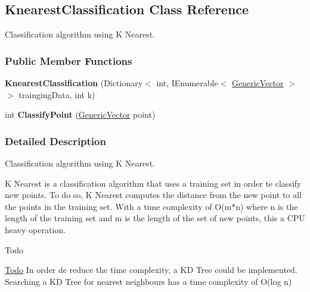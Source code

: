\hypertarget{classDataTools_1_1classification_1_1KnearestClassification}{}\subsection{Knearest\+Classification Class Reference}
\label{classDataTools_1_1classification_1_1KnearestClassification}


Classification algorithm using K Nearest.  


\subsubsection*{Public Member Functions}
\begin{DoxyCompactItemize}
\item 
\mbox{\label{classDataTools_1_1classification_1_1KnearestClassification_a588873a311daa525f0bdf6663b1d5eef}} 
{\bfseries Knearest\+Classification} (Dictionary$<$ int, I\+Enumerable$<$ \hyperlink{classDataTools_1_1GenericVector}{Generic\+Vector} $>$$>$ trainging\+Data, int k)
\item 
\mbox{\label{classDataTools_1_1classification_1_1KnearestClassification_a1c75b6bb19251c5c39a7bfe67a1a2b1f}} 
int {\bfseries Classify\+Point} (\hyperlink{classDataTools_1_1GenericVector}{Generic\+Vector} point)
\end{DoxyCompactItemize}


\subsubsection{Detailed Description}
Classification algorithm using K Nearest. 

K Nearest is a classification algorithm that uses a training set in order te classify new points. To do so, K Nearest computes the distance from the new point to all the points in the training set. With a time complexity of {\ttfamily O(m$\ast$n)} where {\ttfamily n} is the length of the training set and {\ttfamily m} is the length of the set of new points, this a C\+PU heavy operation.

\begin{DoxyRefDesc}{Todo}
\item[\hyperlink{todo__todo000001}{Todo}]In order de reduce the time complexity, a KD Tree could be implemented. Searching a KD Tree for nearest neighbours has a time complexity of {\ttfamily O(log n)} \end{DoxyRefDesc}
